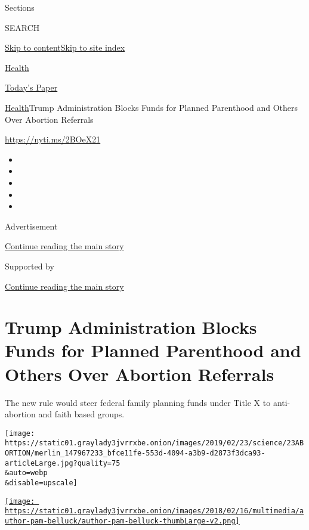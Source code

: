 Sections

SEARCH

\protect\hyperlink{site-content}{Skip to
content}\protect\hyperlink{site-index}{Skip to site index}

\href{https://www.nytimes3xbfgragh.onion/section/health}{Health}

\href{https://myaccount.nytimes3xbfgragh.onion/auth/login?response_type=cookie\&client_id=vi}{}

\href{https://www.nytimes3xbfgragh.onion/section/todayspaper}{Today's
Paper}

\href{/section/health}{Health}\textbar{}Trump Administration Blocks
Funds for Planned Parenthood and Others Over Abortion Referrals

\url{https://nyti.ms/2BOeX21}

\begin{itemize}
\item
\item
\item
\item
\item
\end{itemize}

Advertisement

\protect\hyperlink{after-top}{Continue reading the main story}

Supported by

\protect\hyperlink{after-sponsor}{Continue reading the main story}

\hypertarget{trump-administration-blocks-funds-for-planned-parenthood-and-others-over-abortion-referrals}{%
\section{Trump Administration Blocks Funds for Planned Parenthood and
Others Over Abortion
Referrals}\label{trump-administration-blocks-funds-for-planned-parenthood-and-others-over-abortion-referrals}}

The new rule would steer federal family planning funds under Title X to
anti-abortion and faith based groups.

\texttt{[image: https://static01.graylady3jvrrxbe.onion/images/2019/02/23/science/23ABORTION/merlin\_147967233\_bfce11fe-553d-4094-a3b9-d2873f3dca93-articleLarge.jpg?quality=75\\\&auto=webp\\\&disable=upscale]}

\href{https://www.nytimes3xbfgragh.onion/by/pam-belluck}{\texttt{[image: https://static01.graylady3jvrrxbe.onion/images/2018/02/16/multimedia/author-pam-belluck/author-pam-belluck-thumbLarge-v2.png]}}

